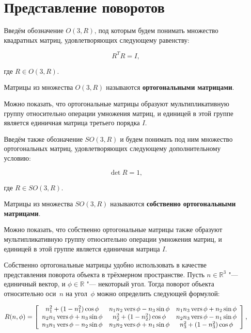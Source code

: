 \section{Представление поворотов}

Введём обозначение $O(3,R)$, под которым будем понимать множество квадратных матриц, удовлетворяющих следующему
равенству:

$$R^T R=I,$$

\noindent где $R \in O(3,R)$.

\begin{definition}
Матрицы из множества $O(3,R)$ называются \textbf{ортогональными матрицами}.
\end{definition}

Можно показать, что ортогональные матрицы образуют мультипликативную группу относительно операции умножения матриц, и
единицей в этой группе является единичная матрица третьего порядка $I$.

Введём также обозначение $SO(3,R)$ и будем понимать под ним множество ортогональных матриц, удовлетворяющих
следующему дополнительному условию:

$$\det R = 1,$$

\noindent где $R \in SO(3, R)$.

\begin{definition}
Матрицы из множества $SO(3,R)$ называются \textbf{собственно ортогональными матрицами}.
\end{definition}

Можно показать, что собственно ортогональные матрицы также образуют мультипликативную группу относительно операции
умножения матриц, и единицей в этой группе является единичная матрица $I$.

Собственно ортогональные матрицы удобно использовать в качестве представления поворота объекта в трёхмерном
пространстве. Пусть $n \in \mathbb{R}^3$ "--- единичный вектор, и $\phi \in \mathbb{R}$ "--- некоторый угол. Тогда
поворот объекта относительно оси~$n$ на угол~$\phi$ можно определить следующей формулой:

\begin{equation}
R(n,\phi)=
\left[ {\begin{array}{ccc}
    n_1^2+(1-n_1^2)\cos\phi     & n_1n_2\operatorname{vers}\phi-n_3\sin\phi & n_1n_3\operatorname{vers}\phi+n_2\sin\phi \\
    n_2n_1\operatorname{vers}\phi+n_3\sin\phi & n_2^2+(1-n_2^2)\cos\phi     & n_2n_3\operatorname{vers}\phi-n_1\sin\phi \\
    n_3n_1\operatorname{vers}\phi-n_2\sin\phi & n_3n_2\operatorname{vers}\phi+n_1\sin\phi & n_3^2+(1-n_3^2)\cos\phi     \\
\end{array} } \right],
\label{rotation-matrix}
\end{equation}


